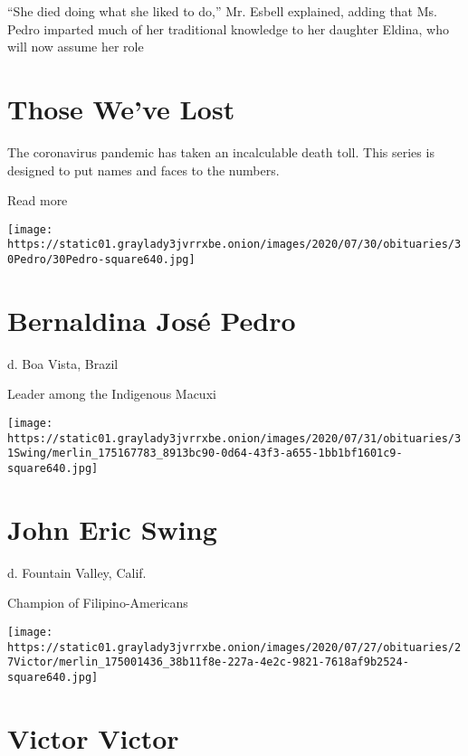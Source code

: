 ``She died doing what she liked to do,'' Mr. Esbell explained, adding
that Ms. Pedro imparted much of her traditional knowledge to her
daughter Eldina, who will now assume her role

\href{https://www.nytimes3xbfgragh.onion/interactive/2020/obituaries/people-died-coronavirus-obituaries.html?action=click\&pgtype=Article\&state=default\&region=BELOW_MAIN_CONTENT\&context=covid_obits_promo}{}

\hypertarget{those-weve-lost}{%
\section{Those We've Lost}\label{those-weve-lost}}

The coronavirus pandemic has taken an incalculable death toll. This
series is designed to put names and faces to the numbers.

Read more

\texttt{[image: https://static01.graylady3jvrrxbe.onion/images/2020/07/30/obituaries/30Pedro/30Pedro-square640.jpg]}

\hypertarget{bernaldina-josuxe9-pedro}{%
\section{Bernaldina José Pedro}\label{bernaldina-josuxe9-pedro}}

d. Boa Vista, Brazil

Leader among the Indigenous Macuxi

\texttt{[image: https://static01.graylady3jvrrxbe.onion/images/2020/07/31/obituaries/31Swing/merlin\_175167783\_8913bc90-0d64-43f3-a655-1bb1bf1601c9-square640.jpg]}

\hypertarget{john-eric-swing}{%
\section{John Eric Swing}\label{john-eric-swing}}

d. Fountain Valley, Calif.

Champion of Filipino-Americans

\texttt{[image: https://static01.graylady3jvrrxbe.onion/images/2020/07/27/obituaries/27Victor/merlin\_175001436\_38b11f8e-227a-4e2c-9821-7618af9b2524-square640.jpg]}

\hypertarget{victor-victor}{%
\section{Victor Victor}\label{victor-victor}}

